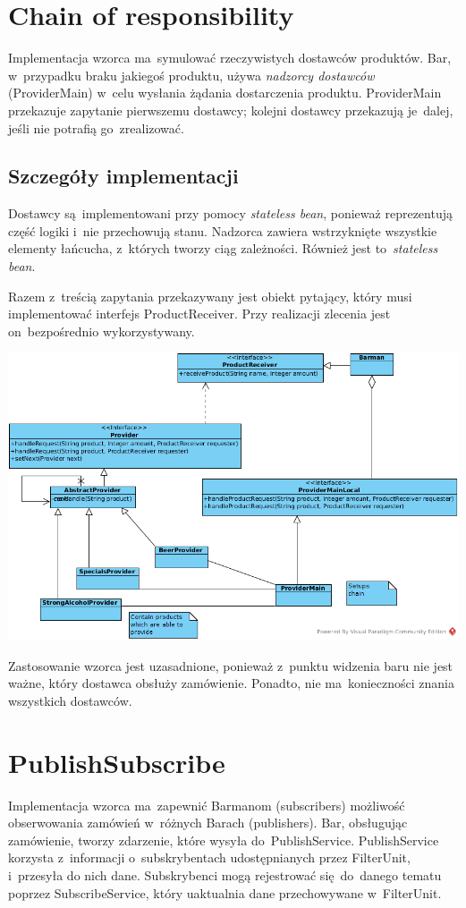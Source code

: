 \documentclass[11pt]{aghdpl}
\begin{document}
\section{Chain of responsibility}
Implementacja wzorca ma~symulować rzeczywistych dostawców produktów. Bar, w~przypadku braku jakiegoś produktu, używa \textit{nadzorcy dostawców} (ProviderMain) w~celu wysłania żądania dostarczenia produktu. ProviderMain przekazuje zapytanie pierwszemu dostawcy;
kolejni dostawcy przekazują je~dalej, jeśli nie potrafią go~zrealizować.

\subsection{Szczegóły implementacji}
Dostawcy są~implementowani przy pomocy \textit{stateless bean}, ponieważ reprezentują część logiki i~nie przechowują stanu. Nadzorca zawiera wstrzyknięte wszystkie elementy łańcucha, z~których tworzy ciąg zależności. Również jest to~\textit{stateless bean}.

Razem z~treścią zapytania przekazywany jest obiekt pytający, który musi implementować interfejs ProductReceiver. Przy realizacji zlecenia jest on~bezpośrednio wykorzystywany.
\begin{center}
 \includegraphics[width=16cm]{chain}
\end{center}

Zastosowanie wzorca jest uzasadnione, ponieważ z~punktu widzenia baru nie jest ważne, który dostawca obsłuży zamówienie. Ponadto, nie ma~konieczności znania wszystkich dostawców.

\section{PublishSubscribe}
Implementacja wzorca ma~zapewnić Barmanom (subscribers) możliwość obserwowania zamówień w~różnych Barach (publishers). Bar, obsługując zamówienie, tworzy zdarzenie, które wysyła do~PublishService. PublishService korzysta z~informacji o~subskrybentach udostępnianych przez FilterUnit, i~przesyła do nich dane. Subskrybenci mogą rejestrować się~do~danego tematu poprzez SubscribeService, który uaktualnia dane przechowywane w~FilterUnit.
\end{document}
